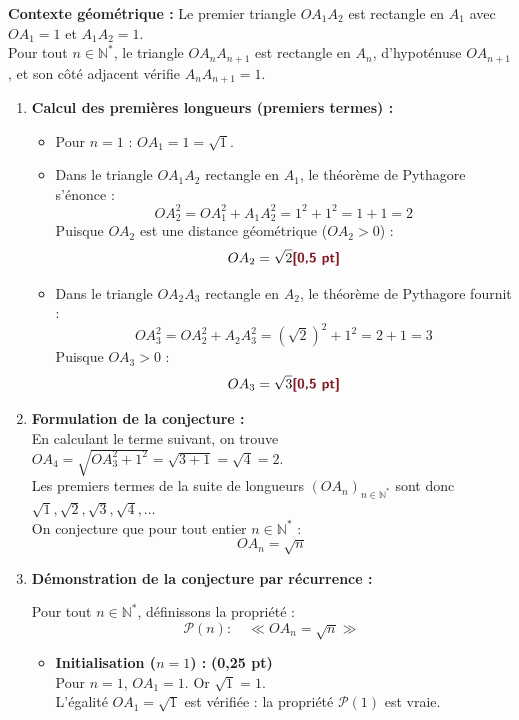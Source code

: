 \documentclass[11pt,a4paper]{article}
\newcommand{\bareme}[1]{\hfill\textbf{\textcolor{secondary}{\sffamily[#1]}}}
\newcommand{\pts}[1]{\textbf{\textcolor{secondary}{\sffamily(#1)}}}
\newcommand{\N}{\mathbb{N}}
\begin{document}
\begin{correctionbox}[Corrigé de l'Exercice 2 \bareme{Total : 4 points}]
\textbf{Contexte géométrique :} Le premier triangle $OA_1A_2$ est rectangle en $A_1$ avec $OA_1 = 1$ et $A_1A_2 = 1$.\\
Pour tout $n \in \N^*$, le triangle $OA_n A_{n+1}$ est rectangle en $A_n$, d'hypoténuse $OA_{n+1}$, et son côté adjacent vérifie $A_n A_{n+1} = 1$.

\begin{enumerate}[label=\textbf{\arabic*.}]
    \item \textbf{Calcul des premières longueurs (premiers termes) :} \bareme{1,0 pt}
    \begin{itemize}[leftmargin=*, label=$\bullet$]
        \item Pour $n = 1$ : $OA_1 = 1 = \sqrt{1}$.
        \item Dans le triangle $OA_1A_2$ rectangle en $A_1$, le théorème de Pythagore s'énonce :
        \[
        OA_2^2 = OA_1^2 + A_1A_2^2 = 1^2 + 1^2 = 1 + 1 = 2
        \]
        Puisque $OA_2$ est une distance géométrique ($OA_2 > 0$) :
        \[
        OA_2 = \sqrt{2} \bareme{0,5 pt}
        \]
        \item Dans le triangle $OA_2A_3$ rectangle en $A_2$, le théorème de Pythagore fournit :
        \[
        OA_3^2 = OA_2^2 + A_2A_3^2 = \left(\sqrt{2}\right)^2 + 1^2 = 2 + 1 = 3
        \]
        Puisque $OA_3 > 0$ :
        \[
        OA_3 = \sqrt{3} \bareme{0,5 pt}
        \]
    \end{itemize}

    \item \textbf{Formulation de la conjecture :} \bareme{0,5 pt}\\
    En calculant le terme suivant, on trouve $OA_4 = \sqrt{OA_3^2 + 1^2} = \sqrt{3 + 1} = \sqrt{4} = 2$.\\
    Les premiers termes de la suite de longueurs $(OA_n)_{n \in \N^*}$ sont donc $\sqrt{1}, \sqrt{2}, \sqrt{3}, \sqrt{4}, \dots$\\
    On conjecture que pour tout entier $n \in \N^*$ :
    \[
    OA_n = \sqrt{n}
    \]

    \item \textbf{Démonstration de la conjecture par récurrence :} \bareme{1,5 pt}

    Pour tout $n \in \N^*$, définissons la propriété :
    \[
    \mathcal{P}(n) : \quad \ll OA_n = \sqrt{n} \gg
    \]

    \begin{itemize}[leftmargin=*, label=$\bullet$]
        \item \textbf{Initialisation ($n = 1$) :} \pts{0,25 pt}\\
        Pour $n = 1$, $OA_1 = 1$. Or $\sqrt{1} = 1$.\\
        L'égalité $OA_1 = \sqrt{1}$ est vérifiée : la propriété $\mathcal{P}(1)$ est vraie.


\end{itemize}
\end{enumerate}
\end{correctionbox}
\end{document}
